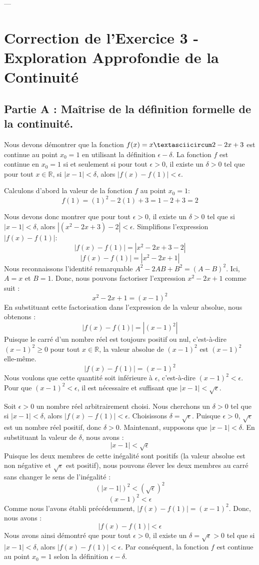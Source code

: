 \documentclass[12pt,a4paper]{report}
\begin{document}
---

\section{Correction de l'Exercice 3 - Exploration Approfondie de la Continuité}

\subsection{Partie A : Maîtrise de la définition formelle de la continuité.}

Nous devons démontrer que la fonction $f(x) = x\textasciicircum 2 - 2x + 3$ est continue au point $x_0 = 1$ en utilisant la définition $\epsilon-\delta$.
La fonction $f$ est continue en $x_0 = 1$ si et seulement si pour tout $\epsilon > 0$, il existe un $\delta > 0$ tel que pour tout $x \in \mathbb{R}$, si $|x - 1| < \delta$, alors $|f(x) - f(1)| < \epsilon$.

Calculons d'abord la valeur de la fonction $f$ au point $x_0 = 1$:
$$ f(1) = (1)^2 - 2(1) + 3 = 1 - 2 + 3 = 2 $$

Nous devons donc montrer que pour tout $\epsilon > 0$, il existe un $\delta > 0$ tel que si $|x - 1| < \delta$, alors $|(x^2 - 2x + 3) - 2| < \epsilon$.
Simplifions l'expression $|f(x) - f(1)|$:
$$ |f(x) - f(1)| = |x^2 - 2x + 3 - 2| $$
$$ |f(x) - f(1)| = |x^2 - 2x + 1| $$
Nous reconnaissons l'identité remarquable $A^2 - 2AB + B^2 = (A - B)^2$. Ici, $A=x$ et $B=1$.
Donc, nous pouvons factoriser l'expression $x^2 - 2x + 1$ comme suit :
$$ x^2 - 2x + 1 = (x - 1)^2 $$
En substituant cette factorisation dans l'expression de la valeur absolue, nous obtenons :
$$ |f(x) - f(1)| = |(x - 1)^2| $$
Puisque le carré d'un nombre réel est toujours positif ou nul, c'est-à-dire $(x-1)^2 \ge 0$ pour tout $x \in \mathbb{R}$, la valeur absolue de $(x-1)^2$ est $(x-1)^2$ elle-même.
$$ |f(x) - f(1)| = (x - 1)^2 $$
Nous voulons que cette quantité soit inférieure à $\epsilon$, c'est-à-dire $(x - 1)^2 < \epsilon$.
Pour que $(x - 1)^2 < \epsilon$, il est nécessaire et suffisant que $|x - 1| < \sqrt{\epsilon}$.

Soit $\epsilon > 0$ un nombre réel arbitrairement choisi.
Nous cherchons un $\delta > 0$ tel que si $|x - 1| < \delta$, alors $|f(x) - f(1)| < \epsilon$.
Choisissons $\delta = \sqrt{\epsilon}$. Puisque $\epsilon > 0$, $\sqrt{\epsilon}$ est un nombre réel positif, donc $\delta > 0$.
Maintenant, supposons que $|x - 1| < \delta$.
En substituant la valeur de $\delta$, nous avons :
$$ |x - 1| < \sqrt{\epsilon} $$
Puisque les deux membres de cette inégalité sont positifs (la valeur absolue est non négative et $\sqrt{\epsilon}$ est positif), nous pouvons élever les deux membres au carré sans changer le sens de l'inégalité :
$$ (|x - 1|)^2 < (\sqrt{\epsilon})^2 $$
$$ (x - 1)^2 < \epsilon $$
Comme nous l'avons établi précédemment, $|f(x) - f(1)| = (x - 1)^2$.
Donc, nous avons :
$$ |f(x) - f(1)| < \epsilon $$
Nous avons ainsi démontré que pour tout $\epsilon > 0$, il existe un $\delta = \sqrt{\epsilon} > 0$ tel que si $|x - 1| < \delta$, alors $|f(x) - f(1)| < \epsilon$.
Par conséquent, la fonction $f$ est continue au point $x_0 = 1$ selon la définition $\epsilon-\delta$.
\end{document}
